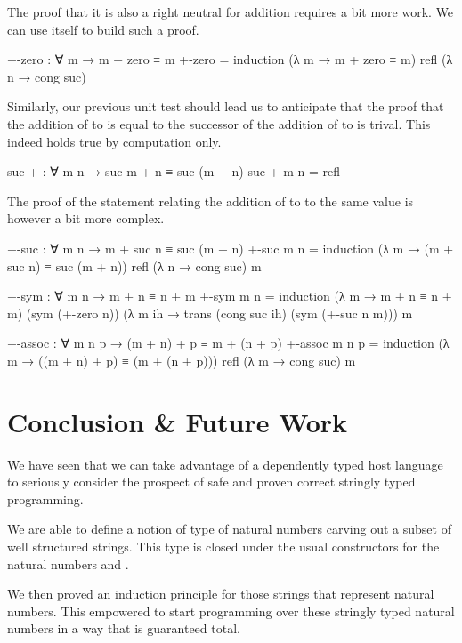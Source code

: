 \documentclass[twocolumn]{article}
\begin{document}
The proof that it is also a right neutral for addition requires a bit more
work. We can use  itself to build such a proof.

\begin{code}
+-zero : ∀ m → m + zero ≡ m
+-zero =
  induction
    (λ m → m + zero ≡ m)
    refl
    (λ n → cong suc)
\end{code}

Similarly, our previous unit test should lead us to anticipate that the
proof that the addition of   to  is equal to the
successor of the addition of  to  is trival. This indeed holds
true by computation only.

\begin{code}
suc-+ : ∀ m n → suc m + n ≡ suc (m + n)
suc-+ m n = refl
\end{code}

The proof of the statement relating the addition of  to  
to the same value is however a bit more complex.

\begin{code}
+-suc : ∀ m n → m + suc n ≡ suc (m + n)
+-suc m n =
  induction
    (λ m → (m + suc n) ≡ suc (m + n))
    refl
    (λ n → cong suc)
    m
\end{code}

\begin{code}
+-sym : ∀ m n → m + n ≡ n + m
+-sym m n =
  induction
    (λ m → m + n ≡ n + m)
    (sym (+-zero n))
    (λ m ih → trans (cong suc ih) (sym (+-suc n m)))
    m

+-assoc : ∀ m n p → (m + n) + p ≡ m + (n + p)
+-assoc m n p =
  induction
    (λ m → ((m + n) + p) ≡ (m + (n + p)))
    refl
    (λ m → cong suc)
    m
\end{code}

\section{Conclusion \& Future Work}

We have seen that we can take advantage of a dependently typed
host language to seriously consider the prospect of safe and
proven correct stringly typed programming.

We are able to define a notion of type of natural numbers carving out a
subset of well structured strings. This type is closed under the usual
constructors for the natural numbers  and .

We then proved an induction principle for those strings that represent
natural numbers. This empowered to start programming over these stringly
typed natural numbers in a way that is guaranteed total.
\end{document}
